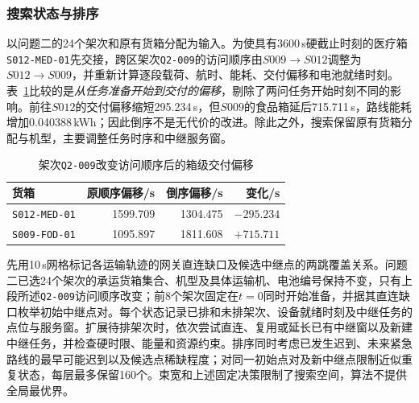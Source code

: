 \subsubsection{搜索状态与排序}
以问题二的24个架次和原有货箱分配为输入。为使具有3600\,s硬截止时刻的医疗箱\texttt{S012-MED-01}先交接，跨区架次\texttt{Q2-009}的访问顺序由$S009\to S012$调整为$S012\to S009$，并重新计算逐段载荷、航时、能耗、交付偏移和电池就绪时刻。表~\ref{tab:q3-order}比较的是\emph{从任务准备开始到交付的偏移}，剔除了两问任务开始时刻不同的影响。前往$S012$的交付偏移缩短295.234\,s，但$S009$的食品箱延后715.711\,s，路线能耗增加0.040388\,kWh；因此倒序不是无代价的改进。除此之外，搜索保留原有货箱分配与机型，主要调整任务时序和中继服务窗。
\begin{table}[htbp]
\centering\small
\caption{架次\texttt{Q2-009}改变访问顺序后的箱级交付偏移}
\label{tab:q3-order}
\begin{tabular}{@{}lrrr@{}}
\toprule
货箱 & 原顺序偏移/s & 倒序偏移/s & 变化/s\\
\midrule
\texttt{S012-MED-01} & 1599.709 & 1304.475 & $-295.234$\\
\texttt{S009-FOD-01} & 1095.897 & 1811.608 & $+715.711$\\
\bottomrule
\end{tabular}
\end{table}

先用10\,s网格标记各运输轨迹的网关直连缺口及候选中继点的两跳覆盖关系。问题二已选24个架次的承运货箱集合、机型及具体运输机、电池编号保持不变，只有上段所述\texttt{Q2-009}访问顺序改变；前8个架次固定在$t=0$同时开始准备，并据其直连缺口枚举初始中继点对。每个状态记录已排和未排架次、设备就绪时刻及中继任务的点位与服务窗。扩展待排架次时，依次尝试直连、复用或延长已有中继窗以及新建中继任务，并检查硬时限、能量和资源约束。排序同时考虑已发生迟到、未来紧急路线的最早可能迟到以及候选点稀缺程度；对同一初始点对及新中继点限制近似重复状态，每层最多保留160个。束宽和上述固定决策限制了搜索空间，算法不提供全局最优界。

